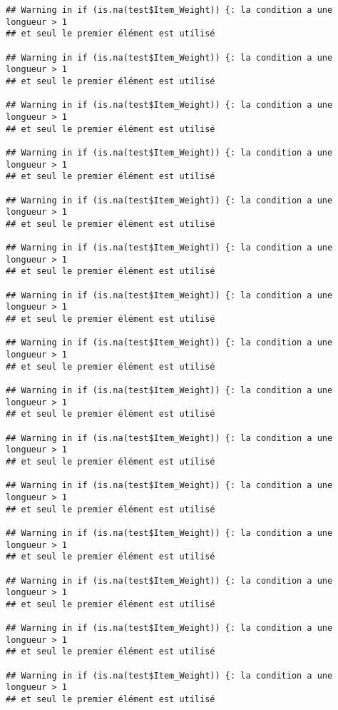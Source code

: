 \documentclass[]{article}
\newenvironment{Shaded}{\begin{snugshade}}{\end{snugshade}}
\newcommand{\KeywordTok}[1]{\textcolor[rgb]{0.13,0.29,0.53}{\textbf{#1}}}
\newcommand{\StringTok}[1]{\textcolor[rgb]{0.31,0.60,0.02}{#1}}
\newcommand{\OperatorTok}[1]{\textcolor[rgb]{0.81,0.36,0.00}{\textbf{#1}}}
\newcommand{\NormalTok}[1]{#1}
\begin{document}
\begin{verbatim}
## Warning in if (is.na(test$Item_Weight)) {: la condition a une longueur > 1
## et seul le premier élément est utilisé

## Warning in if (is.na(test$Item_Weight)) {: la condition a une longueur > 1
## et seul le premier élément est utilisé

## Warning in if (is.na(test$Item_Weight)) {: la condition a une longueur > 1
## et seul le premier élément est utilisé

## Warning in if (is.na(test$Item_Weight)) {: la condition a une longueur > 1
## et seul le premier élément est utilisé

## Warning in if (is.na(test$Item_Weight)) {: la condition a une longueur > 1
## et seul le premier élément est utilisé

## Warning in if (is.na(test$Item_Weight)) {: la condition a une longueur > 1
## et seul le premier élément est utilisé

## Warning in if (is.na(test$Item_Weight)) {: la condition a une longueur > 1
## et seul le premier élément est utilisé

## Warning in if (is.na(test$Item_Weight)) {: la condition a une longueur > 1
## et seul le premier élément est utilisé

## Warning in if (is.na(test$Item_Weight)) {: la condition a une longueur > 1
## et seul le premier élément est utilisé

## Warning in if (is.na(test$Item_Weight)) {: la condition a une longueur > 1
## et seul le premier élément est utilisé

## Warning in if (is.na(test$Item_Weight)) {: la condition a une longueur > 1
## et seul le premier élément est utilisé

## Warning in if (is.na(test$Item_Weight)) {: la condition a une longueur > 1
## et seul le premier élément est utilisé

## Warning in if (is.na(test$Item_Weight)) {: la condition a une longueur > 1
## et seul le premier élément est utilisé

## Warning in if (is.na(test$Item_Weight)) {: la condition a une longueur > 1
## et seul le premier élément est utilisé

## Warning in if (is.na(test$Item_Weight)) {: la condition a une longueur > 1
## et seul le premier élément est utilisé
\end{verbatim}

\begin{Shaded}
\end{Shaded}
\end{document}
